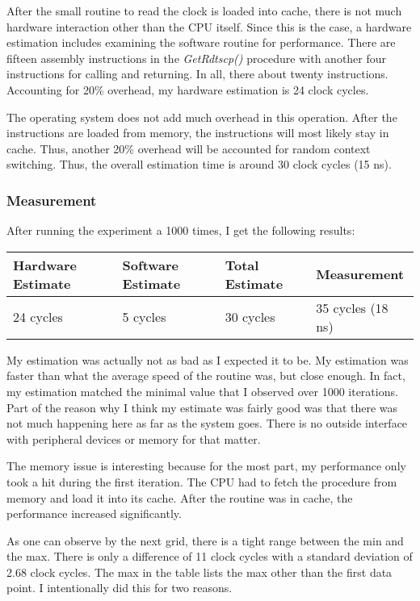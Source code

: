 \documentclass[paper=a4, fontsize=11pt]{scrartcl}
\numberwithin{equation}{section}        %
\numberwithin{figure}{section}          %
\numberwithin{table}{section}               %
\begin{document}
After the small routine to read the clock is loaded into cache, there is not much hardware interaction other than the CPU itself.  Since this is the case, a hardware estimation includes examining the software routine for performance.  There are fifteen assembly instructions in the \textit{GetRdtscp()} procedure with another four instructions for calling and returning.  In all, there about twenty instructions.  Accounting for 20\% overhead, my hardware estimation is 24 clock cycles.

The operating system does not add much overhead in this operation.  After the instructions are loaded from memory, the instructions will most likely stay in cache.  Thus, another 20\% overhead will be accounted for random context switching.  Thus, the overall estimation time is around 30 clock cycles (15 ns).

\subsubsection{Measurement}

After running the experiment a 1000 times, I get the following results:

\begin{center}
    \begin{tabular}{ | l | l | l | l |}
    \hline
    Hardware Estimate & Software Estimate & Total Estimate & Measurement \\ \hline
    24 cycles & 5 cycles & 30 cycles & 35 cycles (18 ns) \\ 
    \hline
    \end{tabular}
\end{center}

My estimation was actually not as bad as I expected it to be.  My estimation was faster than what the average speed of the routine was, but close enough.  In fact, my estimation matched the minimal value that I observed over 1000 iterations.  Part of the reason why I think my estimate was fairly good was that there was not much happening here as far as the system goes.  There is no outside interface with peripheral devices or memory for that matter.

The memory issue is interesting because for the most part, my performance only took a hit during the first iteration.  The CPU had to fetch the procedure from memory and load it into its cache.  After the routine was in cache, the performance increased significantly.

As one can observe by the next grid, there is a tight range between the min and the max.  There is only a difference of 11 clock cycles with a standard deviation of 2.68 clock cycles.  The max in the table lists the max other than the first data point.  I intentionally did this for two reasons.
\end{document}
